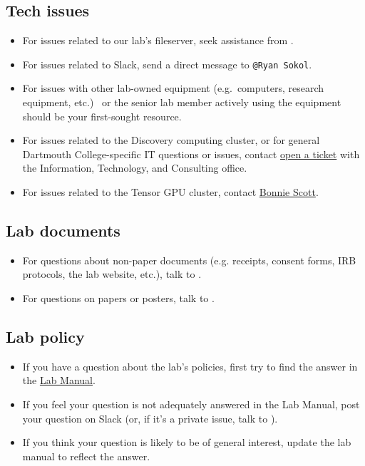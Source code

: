 \documentclass{tufte-book} %
\newcommand{\ourschool}{Dartmouth College}
\begin{document}
\subsection{Tech issues}
\begin{itemize}
\item For issues related to our lab's fileserver, seek assistance from
  \director.

\item For issues related to Slack, send a direct message to \texttt{@Ryan Sokol}.

\item For issues with other lab-owned equipment (e.g.~computers,
  research equipment, etc.) \coordinator~or the senior lab member
  actively using the equipment should be your first-sought resource.

\item For issues related to the Discovery computing cluster, or for general \ourschool-specific IT questions or issues, contact
  \href{mailto:help@dartmouth.edu}{open a ticket} with the Information,
  Technology, and Consulting office.

\item For issues related to the Tensor GPU cluster, contact \href{mailto:Bonnie.J.Scott@dartmouth.edu}{Bonnie Scott}.
\end{itemize}

\subsection{Lab documents}
\begin{itemize}
\item For questions about non-paper documents (e.g. receipts, consent
  forms, IRB protocols, the lab website, etc.), talk to \coordinator.

\item For questions on papers or posters, talk to \director.
\end{itemize}

\subsection{Lab policy}
\begin{itemize}
\item If you have a question about the lab's policies, first try to
  find the answer in the
  \href{https://github.com/ContextLab/lab-manual/tree/master/lab_manual.pdf}{Lab
    Manual}.

\item If you feel your question is not adequately answered in the Lab
  Manual, post your question on Slack (or, if it's a private issue,
  talk to \director).

\item If you think your question is likely to be of general interest,
  update the lab manual to reflect the answer.
\end{itemize}
\end{document}
